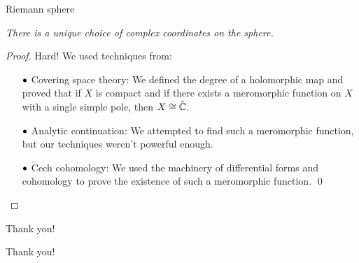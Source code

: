 \documentclass{beamer}
\begin{document}
    \begin{frame}{Riemann sphere}
        \begin{theorem}
            \textit{There is a unique choice of complex coordinates on the sphere.}
        \end{theorem}

        \pause

        \begin{proof}
            Hard!
            \pause
            We used techniques from:
            \begin{itemize}
                \item[\scriptsize$\bullet$] \scriptsize Covering space theory: We defined the degree of a holomorphic map and proved that if $X$ is compact and if there exists a meromorphic function on $X$ with a single simple pole, then $X\cong\hat{\mathbb{C}}$.
                    \pause
                \item[\scriptsize$\bullet$] \scriptsize Analytic continuation: We attempted to find such a meromorphic function, but our techniques weren't powerful enough.
                    \pause
                \item[\scriptsize$\bullet$] \scriptsize $\check{\textrm{C}}$ech cohomology: We used the machinery of differential forms and cohomology to prove the existence of such a meromorphic function.
                    \pause\qed
            \end{itemize}
        \end{proof}
    \end{frame}
    \begin{frame}{Thank you!}
        \begin{center}
            Thank you!
        \end{center}
    \end{frame}
\end{document}
